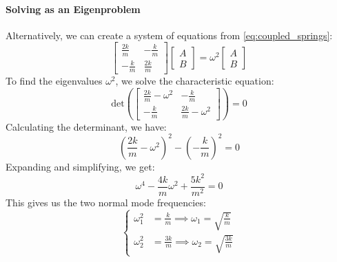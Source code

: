 \documentclass[11pt]{report}
\begin{document}
\paragraph{Solving as an Eigenproblem} Alternatively, we can create a system of equations from \eqref{eq:coupled_springs}:
$$
    \begin{bmatrix}
        \frac{2k}{m} & -\frac{k}{m} \\
        -\frac{k}{m} & \frac{2k}{m}
    \end{bmatrix}
    \begin{bmatrix}
        A \\ B
    \end{bmatrix}
    = \omega^2
    \begin{bmatrix}
        A \\ B
    \end{bmatrix}
$$
To find the eigenvalues \( \omega^2 \), we solve the characteristic equation:
$$
    \text{det}\left(\begin{bmatrix}
        \frac{2k}{m} - \omega^2 & -\frac{k}{m} \\
        -\frac{k}{m} & \frac{2k}{m} - \omega^2
    \end{bmatrix}\right) = 0
$$
Calculating the determinant, we have:
$$
    \left(\frac{2k}{m} - \omega^2\right)^2 - \left(-\frac{k}{m}\right)^2 = 0
$$
Expanding and simplifying, we get:
$$
    \omega^4 - \frac{4k}{m}\omega^2 + \frac{5k^2}{m^2} = 0
$$
This gives us the two normal mode frequencies:
$$
    \begin{cases}
        \omega_1^2 &= \frac{k}{m} \implies \omega_1 = \sqrt{\frac{k}{m}} \\
        \omega_2^2 &= \frac{3k}{m} \implies \omega_2 = \sqrt{\frac{3k}{m}}
    \end{cases}
$$
\end{document}
